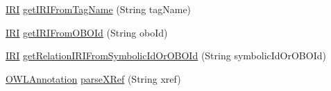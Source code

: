 \begin{DoxyCompactItemize}
\item 
\hyperlink{classorg_1_1semanticweb_1_1owlapi_1_1model_1_1_i_r_i}{I\-R\-I} \hyperlink{classorg_1_1coode_1_1owlapi_1_1obo_1_1parser_1_1_o_b_o_consumer_a36957acc9df75408306de2f30efbf20d}{get\-I\-R\-I\-From\-Tag\-Name} (String tag\-Name)
\item 
\hyperlink{classorg_1_1semanticweb_1_1owlapi_1_1model_1_1_i_r_i}{I\-R\-I} \hyperlink{classorg_1_1coode_1_1owlapi_1_1obo_1_1parser_1_1_o_b_o_consumer_a2c11d83a916e9d255dcda3c6b5480ecd}{get\-I\-R\-I\-From\-O\-B\-O\-Id} (String obo\-Id)
\item 
\hyperlink{classorg_1_1semanticweb_1_1owlapi_1_1model_1_1_i_r_i}{I\-R\-I} \hyperlink{classorg_1_1coode_1_1owlapi_1_1obo_1_1parser_1_1_o_b_o_consumer_a3447f0554579be79f5c2c2aa006e1a0e}{get\-Relation\-I\-R\-I\-From\-Symbolic\-Id\-Or\-O\-B\-O\-Id} (String symbolic\-Id\-Or\-O\-B\-O\-Id)
\item 
\hyperlink{interfaceorg_1_1semanticweb_1_1owlapi_1_1model_1_1_o_w_l_annotation}{O\-W\-L\-Annotation} \hyperlink{classorg_1_1coode_1_1owlapi_1_1obo_1_1parser_1_1_o_b_o_consumer_a00eac40b16790f2759e235eabdf882cf}{parse\-X\-Ref} (String xref)
\end{DoxyCompactItemize}
